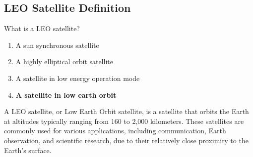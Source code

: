 \subsection{LEO Satellite Definition}
\label{T8B10}

\begin{tcolorbox}[colback=gray!10!white,colframe=black!75!black,title=T8B10]
What is a LEO satellite?
\begin{enumerate}[noitemsep]
    \item A sun synchronous satellite
    \item A highly elliptical orbit satellite
    \item A satellite in low energy operation mode
    \item \textbf{A satellite in low earth orbit}
\end{enumerate}
\end{tcolorbox}

A LEO satellite, or Low Earth Orbit satellite, is a satellite that orbits the Earth at altitudes typically ranging from 160 to 2,000 kilometers. These satellites are commonly used for various applications, including communication, Earth observation, and scientific research, due to their relatively close proximity to the Earth's surface.